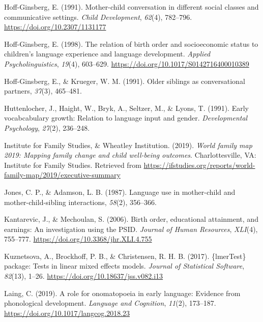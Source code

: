 \documentclass[
  english,
  man,floatsintext]{apa6}
\begin{document}
\leavevmode\hypertarget{ref-hoff-ginsberg_mother-child_1991}{}%
Hoff-Ginsberg, E. (1991). Mother-child conversation in different social classes and communicative settings. \emph{Child Development}, \emph{62}(4), 782--796. \url{https://doi.org/10.2307/1131177}

\leavevmode\hypertarget{ref-hoff-ginsberg_relation_1998}{}%
Hoff-Ginsberg, E. (1998). The relation of birth order and socioeconomic status to children's language experience and language development. \emph{Applied Psycholinguistics}, \emph{19}(4), 603--629. \url{https://doi.org/10.1017/S0142716400010389}

\leavevmode\hypertarget{ref-hoff-ginsberg_older_1991}{}%
Hoff-Ginsberg, E., \& Krueger, W. M. (1991). Older siblings as conversational partners, \emph{37}(3), 465--481.

\leavevmode\hypertarget{ref-huttenlocher_early_1991}{}%
Huttenlocher, J., Haight, W., Bryk, A., Seltzer, M., \& Lyons, T. (1991). Early vocabcabulary growth: Relation to language input and gender. \emph{Developmental Psychology}, \emph{27}(2), 236--248.

\leavevmode\hypertarget{ref-institute_for_family_studies_world_2019}{}%
Institute for Family Studies, \& Wheatley Institution. (2019). \emph{World family map 2019: Mapping family change and child well-being outcomes}. Charlottesville, VA: Institute for Family Studies. Retrieved from \url{https://ifstudies.org/reports/world-family-map/2019/executive-summary}

\leavevmode\hypertarget{ref-jones_language_1987}{}%
Jones, C. P., \& Adamson, L. B. (1987). Language use in mother-child and mother-child-sibling interactions, \emph{58}(2), 356--366.

\leavevmode\hypertarget{ref-kantarevic_birth_2006}{}%
Kantarevic, J., \& Mechoulan, S. (2006). Birth order, educational attainment, and earnings: An investigation using the PSID. \emph{Journal of Human Resources}, \emph{XLI}(4), 755--777. \url{https://doi.org/10.3368/jhr.XLI.4.755}

\leavevmode\hypertarget{ref-kuznetsova_lmertest_2017}{}%
Kuznetsova, A., Brockhoff, P. B., \& Christensen, R. H. B. (2017). \{lmerTest\} package: Tests in linear mixed effects models. \emph{Journal of Statistical Software}, \emph{82}(13), 1--26. \url{https://doi.org/10.18637/jss.v082.i13}

\leavevmode\hypertarget{ref-laing_role_2019}{}%
Laing, C. (2019). A role for onomatopoeia in early language: Evidence from phonological development. \emph{Language and Cognition}, \emph{11}(2), 173--187. \url{https://doi.org/10.1017/langcog.2018.23}
\end{document}
